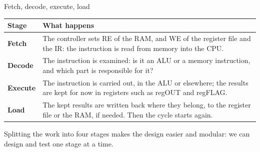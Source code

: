 \documentclass[10pt]{wosm-slides}
\begin{document}
\begin{frame}{Fetch, decode, execute, load}
  \begin{center}
    \small
    \begin{tabular}{@{}lp{}@{}}
      \toprule
      Stage & What happens \\
      \midrule
      \textbf{Fetch} & The controller sets RE of the RAM, and WE of the register file
        and the IR: the instruction is read from memory into the CPU. \\
      \textbf{Decode} & The instruction is examined: is it an ALU or a memory
        instruction, and which part is responsible for it? \\
      \textbf{Execute} & The instruction is carried out, in the ALU or elsewhere; the
        results are kept for now in registers such as regOUT and regFLAG. \\
      \textbf{Load} & The kept results are written back where they belong, to the
        register file or the RAM, if needed. Then the cycle starts again. \\
      \bottomrule
    \end{tabular}
  \end{center}

  \begin{remark}
    Splitting the work into four stages makes the design easier and modular: we can
    design and test one stage at a time.
  \end{remark}
\end{frame}
\end{document}
